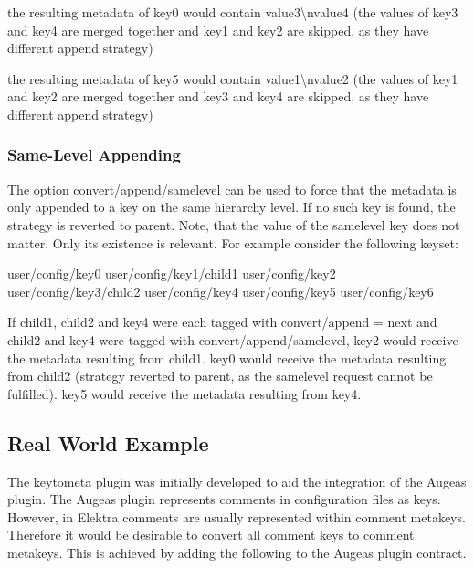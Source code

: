 \begin{DoxyItemize}
\item the resulting metadata of key0 would contain {\ttfamily value3\textbackslash{}nvalue4} (the values of key3 and key4 are merged together and key1 and key2 are skipped, as they have different append strategy)
\item the resulting metadata of key5 would contain {\ttfamily value1\textbackslash{}nvalue2} (the values of key1 and key2 are merged together and key3 and key4 are skipped, as they have different append strategy)
\end{DoxyItemize}

\subsubsection*{Same-\/\+Level Appending}

The option {\ttfamily convert/append/samelevel} can be used to force that the metadata is only appended to a key on the same hierarchy level. If no such key is found, the strategy is reverted to parent. Note, that the value of the samelevel key does not matter. Only its existence is relevant. For example consider the following keyset\+:


\begin{DoxyCode}
user/config/key0
user/config/key1/child1
user/config/key2
user/config/key3/child2
user/config/key4
user/config/key5
user/config/key6
\end{DoxyCode}


If child1, child2 and key4 were each tagged with {\ttfamily convert/append = next} and child2 and key4 were tagged with {\ttfamily convert/append/samelevel}, key2 would receive the metadata resulting from child1. key0 would receive the metadata resulting from child2 (strategy reverted to parent, as the samelevel request cannot be fulfilled). key5 would receive the metadata resulting from key4.

\subsection*{Real World Example}

The keytometa plugin was initially developed to aid the integration of the Augeas plugin. The Augeas plugin represents comments in configuration files as keys. However, in Elektra comments are usually represented within comment metakeys. Therefore it would be desirable to convert all comment keys to comment metakeys. This is achieved by adding the following to the Augeas plugin contract.


